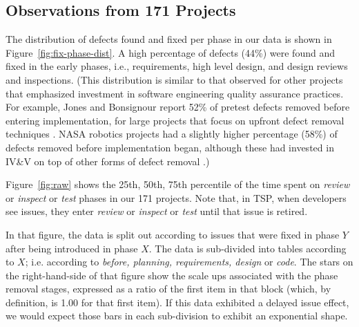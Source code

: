 \documentclass{sig-alternate}
\newcommand{\fig}[1]{Figure~\ref{fig:#1}}
\begin{document}
\subsection{Observations from 171 Projects}

The distribution of defects found and fixed per phase in our data is shown in Figure~\ref{fig:fix-phase-dist}. A high percentage of defects (44\%) were found and fixed in the early phases, i.e., requirements, high level design, and design reviews and inspections. (This distribution is similar to that observed for other projects that emphasized investment in software engineering quality assurance practices. For example, Jones and Bonsignour report 52\% of pretest defects removed before entering implementation, for large projects that focus on upfront defect removal techniques \cite{jones12}. NASA robotics projects had a slightly higher percentage (58\%) of defects removed before implementation began, although these had invested in IV\&V on top of other forms of defect removal \cite{me08a}.)  

\fig{raw} shows the 25th, 50th, 75th percentile
of the time spent on {\em review} or {\em inspect} or {\em test} phases
in our 171 projects.
Note that, in TSP, when developers see issues, they enter {\em review} or 
{\em inspect} or {\em test}
until that issue is retired.

In that figure, the data is split out according to issues that were fixed in phase $Y$ after
being introduced in phase $X$. The data is sub-divided into tables according to $X$;
i.e. according to {\em before, planning, requirements, design} or {\em  code}. 
The stars on the right-hand-side of that figure show the scale ups associated with the phase removal stages,
expressed as a ratio of the first item in that block (which, by definition, is 1.00 for
that first item).
If  this data exhibited a delayed issue effect,  we would expect those bars in each sub-division to exhibit an
exponential shape.
\end{document}
